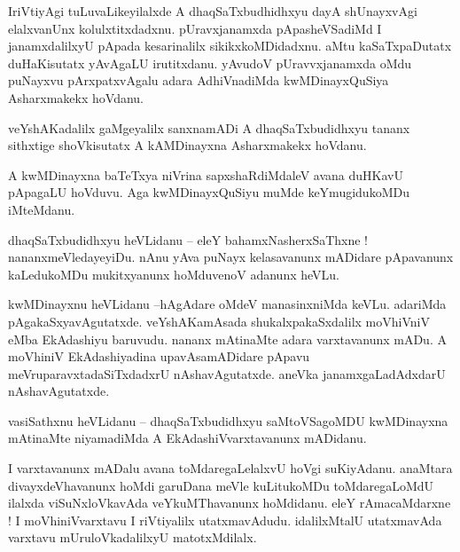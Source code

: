 \documentclass{article}
\begin{document}
\begin{mn}%
IriVtiyAgi tuLuvaLikeyilalxde A dhaqSaTxbudhidhxyu dayA shUnayxvAgi elalxvanUnx kolulxtitxdadxnu. 
pUravxjanamxda pApasheVSadiMd I janamxdalilxyU pApada kesarinalilx sikikxkoMDidadxnu. aMtu 
kaSaTxpaDutatx duHaKisutatx yAvAgaLU irutitxdanu. yAvudoV pUravvxjanamxda oMdu puNayxvu 
pArxpatxvAgalu adara AdhiVnadiMda kwMDinayxQuSiya Asharxmakekx hoVdanu.
\end{mn}

\begin{mn}%
veYshAKadalilx gaMgeyalilx sanxnamADi A dhaqSaTxbudidhxyu tananx sithxtige shoVkisutatx A 
kAMDinayxna Asharxmakekx hoVdanu.
\end{mn}

\begin{mn}%
A kwMDinayxna baTeTxya niVrina sapxshaRdiMdaleV avana duHKavU pApagaLU hoVduvu. Aga kwMDinayxQuSiyu 
muMde keYmugidukoMDu iMteMdanu.
\end{mn}

\begin{mn}%
dhaqSaTxbudidhxyu heVLidanu -- eleY bahamxNasherxSaThxne ! nananxmeVledayeyiDu. nAnu yAva puNayx 
kelasavanunx mADidare pApavanunx kaLedukoMDu mukitxyanunx hoMduvenoV adanunx heVLu.
\end{mn}

\begin{mn}%
kwMDinayxnu heVLidanu --hAgAdare oMdeV manasinxniMda keVLu. adariMda pAgakaSxyavAgutatxde. 
veYshAKamAsada shukalxpakaSxdalilx moVhiVniV eMba EkAdashiyu baruvudu. nananx mAtinaMte adara 
varxtavanunx mADu. A moVhiniV EkAdashiyadina upavAsamADidare pApavu meVruparavxtadaSiTxdadxrU 
nAshavAgutatxde. aneVka janamxgaLadAdxdarU nAshavAgutatxde.
\end{mn}

\begin{mn}%
vasiSathxnu heVLidanu -- dhaqSaTxbudidhxyu saMtoVSagoMDU kwMDinayxna mAtinaMte niyamadiMda A 
EkAdashiVvarxtavanunx mADidanu.
\end{mn}

\begin{mn}%
I varxtavanunx mADalu avana toMdaregaLelalxvU hoVgi suKiyAdanu. anaMtara divayxdeVhavanunx hoMdi 
garuDana meVle kuLitukoMDu toMdaregaLoMdU ilalxda viSuNxloVkavAda veYkuMThavanunx hoMdidanu. eleY 
rAmacaMdarxne ! I moVhiniVvarxtavu I riVtiyalilx utatxmavAdudu. idalilxMtalU utatxmavAda varxtavu 
mUruloVkadalilxyU matotxMdilalx.
\end{mn}
\end{document}
